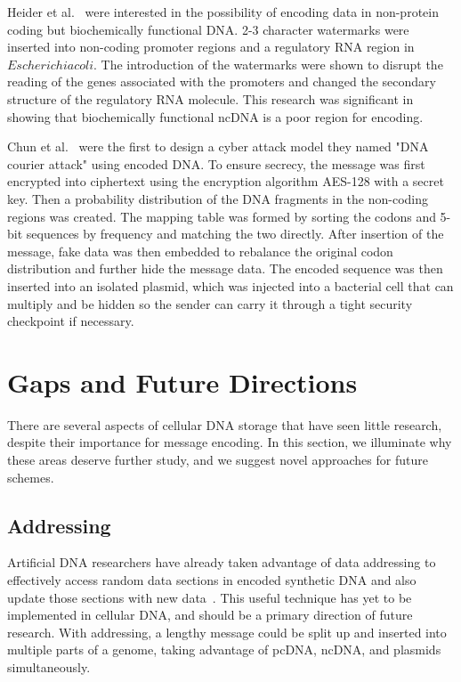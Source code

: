 \documentclass{bioinfo}
\begin{document}
Heider et al.~\cite{HPB2009BMCRN} were interested in the possibility of encoding data in non-protein coding but biochemically functional DNA. 2-3 character watermarks were inserted into non-coding promoter regions and a regulatory RNA region in $Escherichia coli$. The introduction of the watermarks were shown to disrupt the reading of the genes associated with the promoters and changed the secondary structure of the regulatory RNA molecule. This research was significant in showing that biochemically functional ncDNA is a poor region for encoding.

Chun et al.~\cite{CLY2015SAPW} were the first to design a cyber attack model they named "DNA courier attack" using encoded DNA. To ensure secrecy, the message was first encrypted into ciphertext using the encryption algorithm AES-128 with a secret key. Then a probability distribution of the DNA fragments in the non-coding regions was created. The mapping table was formed by sorting the codons and 5-bit sequences by frequency and matching the two directly. After insertion of the message, fake data was then embedded to rebalance the original codon distribution and further hide the message data. The encoded sequence was then inserted into an isolated plasmid, which was injected into a bacterial cell that can multiply and be hidden so the sender can carry it through a tight security checkpoint if necessary.


\section{Gaps and Future Directions}

There are several aspects of cellular DNA storage that have seen little research, despite their importance for message encoding. In this section, we illuminate why these areas deserve further study, and we suggest novel approaches for future schemes.

\subsection{Addressing}

Artificial DNA researchers have already taken advantage of data addressing to effectively access random data sections in encoded synthetic DNA and also update those sections with new data~\cite{SG2016BRI}. This useful technique has yet to be implemented in cellular DNA, and should be a primary direction of future research. With addressing, a lengthy message could be split up and inserted into multiple parts of a genome, taking advantage of pcDNA, ncDNA, and plasmids simultaneously.
\end{document}
